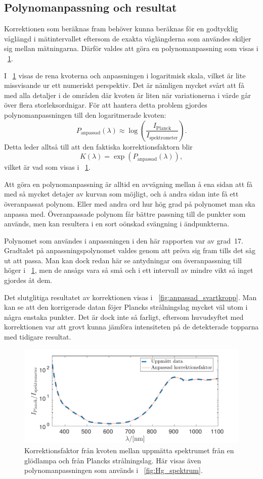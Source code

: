 \documentclass[11pt,a4paper]{article}
\newcommand{\figref}{\figurename~\ref}
\begin{document}
\subsection{Polynomanpassning och resultat}
Korrektionen som beräknas fram behöver kunna beräknas för en
godtycklig våglängd i mätintervallet eftersom de exakta våglängderna
som användes skiljer sig mellan mätningarna. Därför valdes att göra en
polynomanpassning som visas i \figref{fig:korrektionsfaktor}. 

I \figref{fig:korrektionsfaktor} visas de rena kvoterna och
anpassningen i logaritmisk skala, vilket är lite missvisande ur ett
numeriskt perspektiv. Det är nämligen mycket svårt att få med alla
detaljer i de områden där kvoten är liten när variationerna i värde
går över flera storleksordnigar. För att hantera detta problem gjordes
polynomanpassningen till den logaritmerade kvoten: 
\[
P_\text{anpassad} (\lambda) 
\approx \log(\frac{I_\text{Planck}}{I_\text{spektrometer}}).
\]
Detta leder alltså till att den faktiska korrektionsfaktorn blir
\[
K(\lambda) = \exp(P_\text{anpassad}(\lambda)),
\]
vilket är vad som visas i \figref{fig:korrektionsfaktor}.

Att göra en polynomanpassning är alltid en avvägning mellan å ena
sidan att få med så mycket detajer av kurvan som möjligt, och å andra
sidan inte få ett överanpassat polynom. Eller med andra ord hur hög
grad på polynomet man ska anpassa med. Överanpassade polynom får
bättre passning till de punkter som används, men kan resultera i en
sort oönskad svängning i ändpunkterna. 

Polynomet som användes i anpassningen i den här rapporten var av
grad~17. Gradtalet på anpassningspolynomet valdes genom att pröva sig
fram tills det såg ut att passa. Man kan dock redan här se antydningar
om överanpassning till höger i \figref{fig:korrektionsfaktor}, men de
ansågs vara så små och i ett intervall av mindre vikt så inget gjordes
åt dem. 

Det slutglitiga resultatet av korrektionen visas i
\figref{fig:anpassad_svartkropp}. Man kan se att den korrigerade datan
föjer Plancks strålningslag mycket väl utom i några enstaka
punkter. Det är dock inte så farligt, eftersom huvudsyftet med
korrektionen var att grovt kunna jämföra intensiteten på de
detekterade topparna med tidigare resultat. 

\begin{figure}\centering
\centerline{ %
\includegraphics[width=.8\textwidth]{korrektionsfaktor.pdf}
}
\caption{Korrektionsfaktor från kvoten mellan uppmätta spektrumet från
en glödlampa och från Plancks strålningslag. Här visas även
polynomanpassningen som används i \figref{fig:Hg_spektrum}.}
\label{fig:korrektionsfaktor}
\end{figure}
\end{document}
